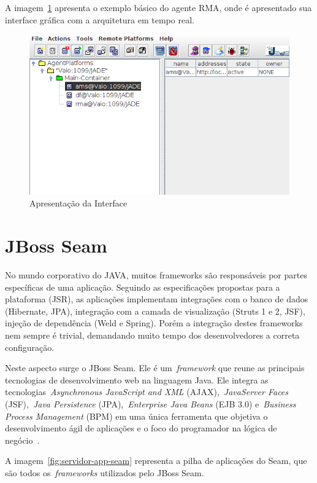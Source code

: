 A imagem~\ref{fig:tela-jade} apresenta o exemplo básico do agente RMA, onde é apresentado sua interface gráfica com a arquitetura em tempo real.
\begin{figure}
	\centering
	\includegraphics[scale=0.65]{images/tela-jade.png}
	\caption{Apresentação da Interface}
	\label{fig:tela-jade}
\end{figure}

\section{JBoss Seam}

No mundo corporativo do JAVA, muitos frameworks são responsáveis por partes específicas de uma aplicação. Seguindo as especificações propostas para a plataforma (JSR), as aplicações implementam integrações com o banco de dados (Hibernate, JPA), integração com a camada de visualização (Struts 1 e 2, JSF), injeção de dependência (Weld e Spring). Porém a integração destes frameworks nem sempre é trivial, demandando muito tempo dos desenvolvedores a correta configuração.

Neste aspecto surge o JBoss Seam. Ele é um~\emph{framework} que reune as principais tecnologias de desenvolvimento web na linguagem Java. Ele integra as tecnologias~\emph{Asynchronous JavaScript and XML} (AJAX),~\emph{JavaServer Faces} (JSF),~\emph{Java Persistence} (JPA),~\emph{Enterprise Java Beans} (EJB 3.0) e~\emph{Business Process Management} (BPM) em uma única ferramenta que objetiva o desenvolvimento ágil de aplicações e o foco do programador na lógica de negócio~\cite{seamSite}.

A imagem~\ref{fig:servidor-app-seam} representa a pilha de aplicações do Seam, que são todos os~\emph{frameworks} utilizados pelo JBoss Seam.

